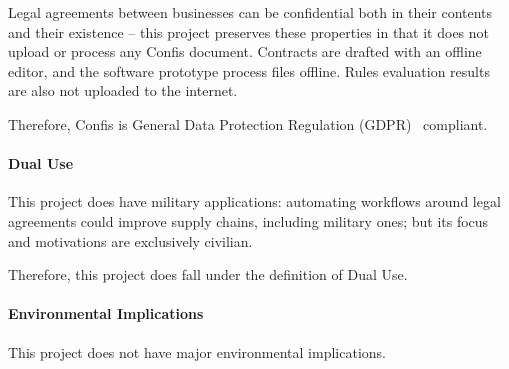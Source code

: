 Legal agreements between businesses can be confidential both in their contents and their existence -- this project preserves these properties in that it does not upload or process any Confis document.
Contracts are drafted with an offline editor, and the software prototype process files offline.
Rules evaluation results are also not uploaded to the internet.

Therefore, Confis is General Data Protection Regulation (GDPR)~\cite{gdprInfo} compliant.

\paragraph{Dual Use}\label{par:dual-use}

This project does have military applications: automating workflows around legal agreements could improve supply chains, including military ones;
but its focus and motivations are exclusively civilian.

Therefore, this project does fall under the definition of Dual Use.

\paragraph{Environmental Implications}\label{par:environmental-implications}

This project does not have major environmental implications.

